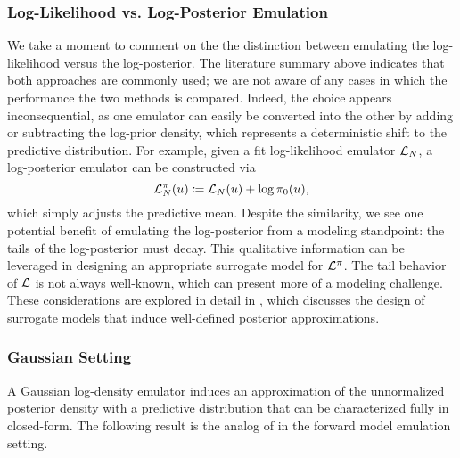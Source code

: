 \documentclass[12pt]{article}
\begin{document}
\subsubsection{Log-Likelihood vs. Log-Posterior Emulation} \label{sec:llik_vs_lpost}
We take a moment to comment on the the distinction between emulating the log-likelihood versus
the log-posterior. The literature summary above indicates that both approaches are commonly used;
we are not aware of any cases in which the performance the two methods is compared. 
Indeed, the choice appears inconsequential, as one emulator can easily be converted into the other 
by adding or subtracting the log-prior density, which represents a deterministic shift to the predictive 
distribution. For example, given a fit log-likelihood emulator $\llikEm[\Ndesign]$, a log-posterior emulator 
can be constructed via
\begin{equation}
\lpostEm[\Ndesign](\Par) \Def \llikEm[\Ndesign](\Par) + \log \priorDens(\Par),
\end{equation}
which simply adjusts the predictive mean. Despite the similarity, we see one potential benefit of emulating 
the log-posterior from a modeling standpoint: the tails of the log-posterior must decay. This
qualitative information can be leveraged in designing an appropriate surrogate model for
$\lpost$. The tail behavior of $\llik$ is not always well-known, which can present more of a 
modeling challenge. These considerations are explored in detail in 
, which discusses the design of surrogate models that induce well-defined 
posterior approximations. 

\subsubsection{Gaussian Setting} \label{ldens_Gaussian}
A Gaussian log-density emulator induces an approximation of the unnormalized posterior 
density with a predictive distribution that can be characterized fully in closed-form. The following 
result is the analog of  in the forward model 
emulation setting.
\end{document}
